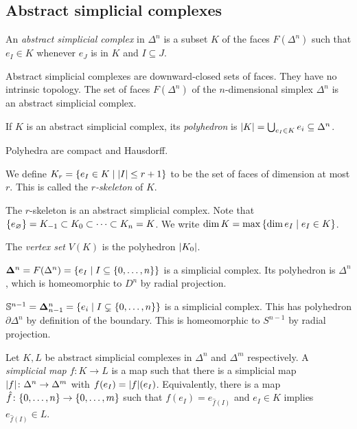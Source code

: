 \subsection{Abstract simplicial complexes}
\begin{definition}
	An \emph{abstract simplicial complex} in \( \Delta^n \) is a subset \( K \) of the faces \( F(\Delta^n) \) such that \( e_I \in K \) whenever \( e_J \) is in \( K \) and \( I \subseteq J \).
\end{definition}
\begin{remark}
	Abstract simplicial complexes are downward-closed sets of faces.
	They have no intrinsic topology.
	The set of faces \( F(\Delta^n) \) of the \( n \)-dimensional simplex \( \Delta^n \) is an abstract simplicial complex.
\end{remark}
\begin{definition}
	If \( K \) is an abstract simplicial complex, its \emph{polyhedron} is \( \abs{K} = \bigcup_{e_I \in K} e_i \subseteq \Delta^n \).
\end{definition}
\begin{remark}
	Polyhedra are compact and Hausdorff.
\end{remark}
\begin{definition}
	We define \( K_r = \qty{e_I \in K \mid \abs{I} \leq r + 1} \) to be the set of faces of dimension at most \( r \).
	This is called the \emph{\( r \)-skeleton} of \( K \).
\end{definition}
The \( r \)-skeleton is an abstract simplicial complex.
Note that \( \qty{e_\varnothing} = K_{-1} \subset K_0 \subset \dots \subset K_n = K \).
We write \( \dim K = \max\qty{\dim e_I \mid e_I \in K} \).
\begin{definition}
	The \emph{vertex set} \( V(K) \) is the polyhedron \( \abs{K_0} \).
\end{definition}
\begin{example}
	\( \bm \Delta^n = F(\Delta^n) = \qty{e_I \mid I \subseteq \qty{0, \dots, n}} \) is a simplicial complex.
	Its polyhedron is \( \Delta^n \), which is homeomorphic to \( D^n \) by radial projection.
\end{example}
\begin{example}
	\( \mathbb S^{n-1} = \bm \Delta_{n-1}^n = \qty{e_i \mid I \subsetneq \qty{0, \dots, n}} \) is a simplicial complex.
	This has polyhedron \( \partial \Delta^n \) by definition of the boundary.
	This is homeomorphic to \( S^{n-1} \) by radial projection.
\end{example}
\begin{definition}
	Let \( K, L \) be abstract simplicial complexes in \( \Delta^n \) and \( \Delta^m \) respectively.
	A \emph{simplicial map} \( f \colon K \to L \) is a map such that there is a simplicial map \( \abs{f} \colon \Delta^n \to \Delta^m \) with \( f(e_I) = \abs{f}(e_I) \).
	Equivalently, there is a map \( \hat f \colon \qty{0, \dots, n} \to \qty{0, \dots, m} \) such that \( f(e_I) = e_{\hat f(I)} \) and \( e_I \in K \) implies \( e_{\hat f(I)} \in L \).
\end{definition}
